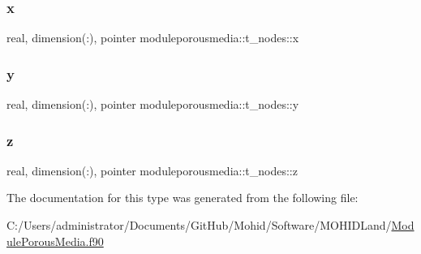 \subsubsection{\texorpdfstring{x}{x}}
{\footnotesize\ttfamily real, dimension(\+:), pointer moduleporousmedia\+::t\+\_\+nodes\+::x\hspace{0.3cm}{\ttfamily [private]}}

\mbox{\label{structmoduleporousmedia_1_1t__nodes_a34491def5f18f47a3a32027d7aedab60}} 
\subsubsection{\texorpdfstring{y}{y}}
{\footnotesize\ttfamily real, dimension(\+:), pointer moduleporousmedia\+::t\+\_\+nodes\+::y\hspace{0.3cm}{\ttfamily [private]}}

\mbox{\label{structmoduleporousmedia_1_1t__nodes_aa953275f7c441b238baab6e203a34ce5}} 
\subsubsection{\texorpdfstring{z}{z}}
{\footnotesize\ttfamily real, dimension(\+:), pointer moduleporousmedia\+::t\+\_\+nodes\+::z\hspace{0.3cm}{\ttfamily [private]}}



The documentation for this type was generated from the following file\+:\begin{DoxyCompactItemize}
\item 
C\+:/\+Users/administrator/\+Documents/\+Git\+Hub/\+Mohid/\+Software/\+M\+O\+H\+I\+D\+Land/\mbox{\hyperlink{_module_porous_media_8f90}{Module\+Porous\+Media.\+f90}}\end{DoxyCompactItemize}
